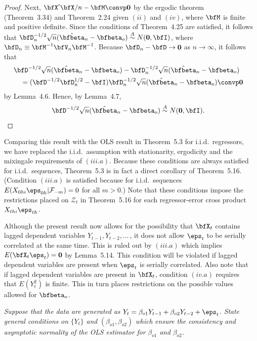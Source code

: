 \begin{proof}
Next, $\bfX'\bfX/n - \bfM \convp \mathbf{0}$ by the ergodic theorem (Theorem~3.34) and Theorem~2.24 given $(ii)$ and $(iv)$, where $\bfM$ is finite and positive definite. Since the conditions of Theorem~4.25 are satisfied, it follows that $\bfD_n^{-1/2}\sqrt{n}(\hat{\bfbeta}_n - \bfbeta_o) \overset{A}{\sim} N(\mathbf{0}, \bfI)$, where $\bfD_n \equiv \bfM^{-1}\bfV_n\bfM^{-1}$. Because $\bfD_n - \bfD \to \mathbf{0}$ as $n \to \infty$, it follows that
\begin{align*}
&\bfD^{-1/2}\sqrt{n}(\hat{\bfbeta}_n - \bfbeta_o) - \bfD_n^{-1/2}\sqrt{n}(\hat{\bfbeta}_n - \bfbeta_o) \\
&\quad= (\bfD^{-1/2}\bfD_n^{1/2} - \bfI)\bfD_n^{-1/2}\sqrt{n}(\hat{\bfbeta}_n - \bfbeta_o) \convp \mathbf{0}
\end{align*}
by Lemma~4.6. Hence, by Lemma~4.7,
\[
\bfD^{-1/2}\sqrt{n}(\hat{\bfbeta}_n - \bfbeta_o) \overset{A}{\sim} N(\mathbf{0}, \bfI).
\]
\end{proof}

Comparing this result with the OLS result in Theorem~5.3 for i.i.d.\ regressors, we have replaced the i.i.d.\ assumption with stationarity, ergodicity and the mixingale requirements of $(iii.a)$. Because these conditions are always satisfied for i.i.d.\ sequences, Theorem~5.3 is in fact a direct corollary of Theorem~5.16. (Condition $(iii.a)$ is satisfied because for i.i.d.\ sequences $E(X_{0hi}\eps_{0h}|\mathcal{F}_{-m}) = 0$ for all $m > 0$.) Note that these conditions impose the restrictions placed on $\mathcal{Z}_t$ in Theorem~5.16 for each regressor-error cross product $X_{thi}\eps_{th}$.

Although the present result now allows for the possibility that $\bfX_t$ contains lagged dependent variables $Y_{t-1}, Y_{t-2}, \ldots$\,, it does not allow $\eps_t$ to be serially correlated at the same time. This is ruled out by $(iii.a)$ which implies $E(\bfX_t\eps_t) = \mathbf{0}$ by Lemma~5.14. This condition will be violated if lagged dependent variables are present when $\eps_t$ is serially correlated. Also note that if lagged dependent variables are present in $\bfX_t$, condition $(iv.a)$ requires that $E(Y_t^2)$ is finite. This in turn places restrictions on the possible values allowed for $\bfbeta_o$.

\begin{exercises}

\item\label{ex:ar2-conditions} \textit{Suppose that the data are generated as $Y_t = \beta_{o1}Y_{t-1} + \beta_{o2}Y_{t-2} + \eps_t$. State general conditions on $\{Y_t\}$ and $(\beta_{o1}, \beta_{o2})$ which ensure the consistency and asymptotic normality of the OLS estimator for $\beta_{o1}$ and $\beta_{o2}$.}

\end{exercises}

